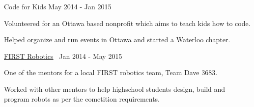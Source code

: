 \begin{cventries}
  \cvprojectentry
    {Code for Kids} %
    {May 2014 - Jan 2015}
    {
      \begin{cvitems} %
        \item {Volunteered for an Ottawa based nonprofit which aims to teach kids how to code.}
        \item {Helped organize and run events in Ottawa and started a Waterloo chapter.}
      \end{cvitems}
    }
  
  \cvprojectentry
    {\href{http://teamdave.ca/}{FIRST Robotics}\ \faPaperclip} %
    {Jan 2014 - May 2015}
    {
      \begin{cvitems} %
        \item {One of the mentors for a local FIRST robotics team, Team Dave 3683.}
        \item {Worked with other mentors to help highschool students design, build and program robots as per the cometition requirements.}
      \end{cvitems}
    }
\end{cventries}
